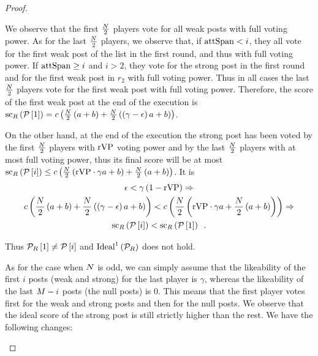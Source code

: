 \begin{proof}
\begin{itemize}
    We observe that the first $\frac{N}{2}$ players vote for all weak
    posts with full voting power. As for the last $\frac{N}{2}$
    players, we observe that, if $\mathrm{attSpan} < i$, they all vote for the first
    weak post of the list in the first round, and thus with full voting power. If
    $\mathrm{attSpan} \geq i$ and $i > 2$, they vote for the strong post in the first
    round and for the first weak post in $r_2$ with full voting power. Thus in
    all cases the last $\frac{N}{2}$ players vote for the first weak
    post with full voting power. Therefore, the score of the first weak post at
    the end of the execution is
    $\mathrm{sc}_{R}\left(\mathcal{P}\left[1\right]\right) =
    c\left(\frac{N}{2}\left(a + b\right) +
    \frac{N}{2}\left(\left(\gamma - \epsilon\right) a +
    b\right)\right)$.

    On the other hand, at the end of the execution the strong post has been
    voted by the first $\frac{N}{2}$ players with $\mathrm{rVP}$
    voting power and by the last $\frac{N}{2}$ players with at most
    full voting power, thus its final score will be at most
    $\mathrm{sc}_{R}\left(\mathcal{P}\left[i\right]\right) \leq
    c\left(\frac{N}{2}\left(\mathrm{rVP} \cdot \gamma a +
    b\right) + \frac{N}{2}\left(a + b\right)\right)$. It is
    \begin{gather*}
      \epsilon < \gamma\left(1 - \mathrm{rVP}\right) \Rightarrow \\
      c\left(\frac{N}{2}\left(a + b\right) +
      \frac{N}{2}\left(\left(\gamma - \epsilon\right) a +
      b\right)\right) < c\left(\frac{N}{2}\left(\mathrm{rVP}
      \cdot \gamma a + \frac{N}{2}\left(a + b\right)\right)\right)
      \Rightarrow \\
      \mathrm{sc}_{R}\left(\mathcal{P}\left[i\right]\right) <
      \mathrm{sc}_{R}\left(\mathcal{P}\left[1\right]\right) \enspace.
    \end{gather*}

    Thus $\mathcal{P}_{R}\left[1\right] \neq \mathcal{P}\left[i\right]$ and
    $\mathrm{Ideal}^1\left(\mathcal{P}_{R}\right)$ does not hold.

    As for the case when $N$ is odd, we can simply assume that the
    likeability of the first $i$ posts (weak and strong) for the last player is
    $\gamma$, whereas the likeability of the last $M - i$ posts (the null
    posts) is 0. This means that the first player votes first for the weak and
    strong posts and then for the null posts. We observe that the ideal score of
    the strong post is still strictly higher than the rest. We have the
    following changes:


\end{itemize}
\end{proof}
